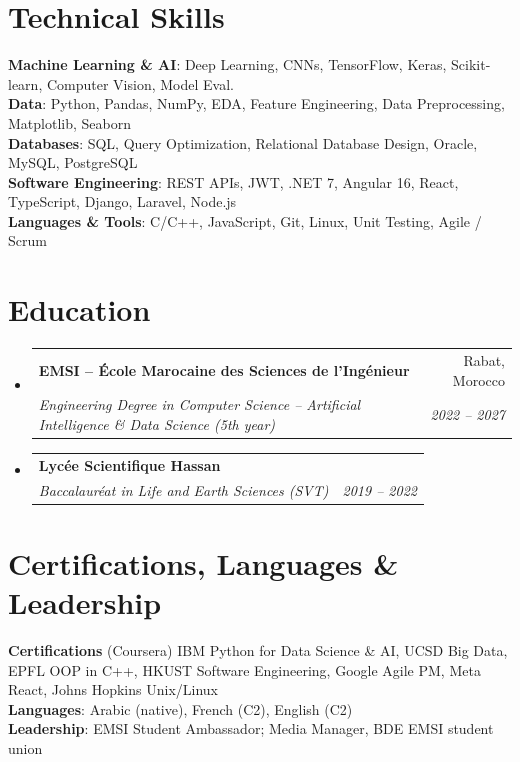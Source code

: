 \documentclass[a4paper,11pt]{article}
\makeatletter
\newcommand{\resumeSubheading}[4]{
  \vspace{-2pt}\item
    \begin{tabular*}{0.97\textwidth}[t]{l@{\extracolsep{\fill}}r}
      \textbf{#1} & #2 \\
      \textit{\small#3} & \textit{\small #4} \\
    \end{tabular*}\vspace{-7pt}
}
\newcommand{\resumeSubHeadingListStart}{\begin{itemize}[leftmargin=0.15in, label={}]}
\newcommand{\resumeSubHeadingListEnd}{\end{itemize}}
\makeatother
\begin{document}
\section{Technical Skills}
 \begin{itemize}[leftmargin=0.15in, label={}]
    \small{\item{
     \textbf{Machine Learning \& AI}{: Deep Learning, CNNs, TensorFlow, Keras, Scikit-learn, Computer Vision, Model Eval.} \\
     \textbf{Data}{: Python, Pandas, NumPy, EDA, Feature Engineering, Data Preprocessing, Matplotlib, Seaborn} \\
     \textbf{Databases}{: SQL, Query Optimization, Relational Database Design, Oracle, MySQL, PostgreSQL} \\
     \textbf{Software Engineering}{: REST APIs, JWT, .NET 7, Angular 16, React, TypeScript, Django, Laravel, Node.js} \\
     \textbf{Languages \& Tools}{: C/C++, JavaScript, Git, Linux, Unit Testing, Agile / Scrum}
    }}
 \end{itemize}

\section{Education}
  \resumeSubHeadingListStart
    \resumeSubheading
      {EMSI -- École Marocaine des Sciences de l'Ingénieur}{Rabat, Morocco}
      {Engineering Degree in Computer Science -- Artificial Intelligence \& Data Science (5th year)}{2022 -- 2027}
    \resumeSubheading
      {Lycée Scientifique Hassan}{}
      {Baccalauréat in Life and Earth Sciences (SVT)}{2019 -- 2022}
  \resumeSubHeadingListEnd

\section{Certifications, Languages \& Leadership}
 \begin{itemize}[leftmargin=0.15in, label={}]
    \small{\item{
     \textbf{Certifications} (Coursera) IBM Python for Data Science \& AI, UCSD Big Data, EPFL OOP in C++, HKUST Software Engineering, Google Agile PM, Meta React, Johns Hopkins Unix/Linux \\
     \textbf{Languages}{: Arabic (native), French (C2), English (C2)} \\
     \textbf{Leadership}{: EMSI Student Ambassador; Media Manager, BDE EMSI student union}
    }}
 \end{itemize}
\end{document}
